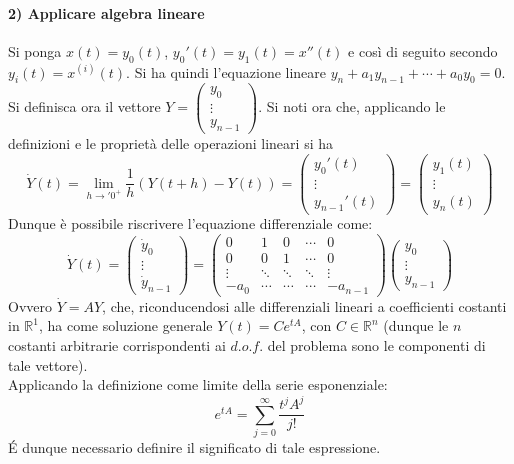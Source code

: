 \documentclass[10pt]{article}
\theoremstyle{plain}
\begin{document}
\paragraph{2) Applicare algebra lineare}
Si ponga $x(t) = y_0(t)$, $y_0'(t) = y_1(t) = x''(t)$ e così di seguito secondo $y_i(t) = x^{(i)}(t)$. Si ha quindi l'equazione lineare $y_n + a_1 y_{n-1} + \cdots + a_0 y_0 = 0$.
\\Si definisca ora il vettore $\displaystyle Y = \begin{pmatrix} 
y_0\\ \vdots \\y_{n-1}
\end{pmatrix}$. Si noti ora che, applicando le definizioni e le proprietà delle operazioni lineari si ha 
\[\dot{Y}(t) = \lim\limits_{h \rightarrow '0^+} \frac{1}{h}(Y(t+h) - Y(t)) = \begin{pmatrix}
    y_0'(t)\\ \vdots \\ y_{n-1}'(t)
\end{pmatrix} = \begin{pmatrix}
    y_1(t) \\ \vdots \\ y_n(t)
\end{pmatrix}\]
Dunque è possibile riscrivere l'equazione differenziale come:
\[\dot{Y}(t) = \begin{pmatrix}
        \dot{y}_0\\ \vdots \\ \dot{y}_{n-1}
\end{pmatrix} = \begin{pmatrix}
    0 & 1 & 0 & \cdots & 0\\
    0 & 0 & 1 & \cdots & 0\\
    \vdots & \ddots & \ddots & \ddots & \vdots\\
    -a_0 & \cdots & \cdots & \cdots & - a_{n-1}
\end{pmatrix} \begin{pmatrix}
    y_0\\ \vdots \\ y_{n-1}
\end{pmatrix}\]
Ovvero $\dot{Y} = A Y$, che, riconducendosi alle differenziali lineari a coefficienti costanti in $\mathbb{R}^1$, ha come soluzione generale $\displaystyle Y(t) = C e^{t A}$, con $C \in \mathbb{R}^n$ (dunque le $n$ costanti arbitrarie corrispondenti ai $d.o.f.$ del problema sono le componenti di tale vettore).
\\Applicando la definizione come limite della serie esponenziale:
\[e^{t A} = \sum \limits_{j = 0}^\infty \frac{t^j A^j}{j!}\]
\'E dunque necessario definire il significato di tale espressione.
\end{document}
